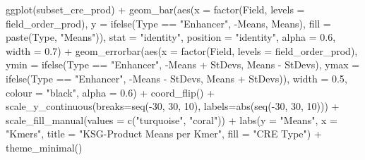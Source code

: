 \documentclass[
  letterpaper,
  DIV=11,
  numbers=noendperiod]{scrartcl}
\newenvironment{Shaded}{\begin{snugshade}}{\end{snugshade}}
\newcommand{\AttributeTok}[1]{\textcolor[rgb]{0.40,0.45,0.13}{#1}}
\newcommand{\DecValTok}[1]{\textcolor[rgb]{0.68,0.00,0.00}{#1}}
\newcommand{\FloatTok}[1]{\textcolor[rgb]{0.68,0.00,0.00}{#1}}
\newcommand{\FunctionTok}[1]{\textcolor[rgb]{0.28,0.35,0.67}{#1}}
\newcommand{\NormalTok}[1]{\textcolor[rgb]{0.00,0.23,0.31}{#1}}
\newcommand{\SpecialCharTok}[1]{\textcolor[rgb]{0.37,0.37,0.37}{#1}}
\newcommand{\StringTok}[1]{\textcolor[rgb]{0.13,0.47,0.30}{#1}}
\begin{document}
\begin{Shaded}
\begin{Highlighting}[]
\FunctionTok{ggplot}\NormalTok{(subset\_cre\_prod) }\SpecialCharTok{+}
  \FunctionTok{geom\_bar}\NormalTok{(}\FunctionTok{aes}\NormalTok{(}\AttributeTok{x =} \FunctionTok{factor}\NormalTok{(Field, }\AttributeTok{levels =}\NormalTok{ field\_order\_prod), }
               \AttributeTok{y =} \FunctionTok{ifelse}\NormalTok{(Type }\SpecialCharTok{==} \StringTok{"Enhancer"}\NormalTok{, }\SpecialCharTok{{-}}\NormalTok{Means, Means), }
                          \AttributeTok{fill =} \FunctionTok{paste}\NormalTok{(Type, }\StringTok{"Means"}\NormalTok{)),}
               \AttributeTok{stat =} \StringTok{"identity"}\NormalTok{, }\AttributeTok{position =} \StringTok{"identity"}\NormalTok{, }
               \AttributeTok{alpha =} \FloatTok{0.6}\NormalTok{, }\AttributeTok{width =} \FloatTok{0.7}\NormalTok{) }\SpecialCharTok{+}
  \FunctionTok{geom\_errorbar}\NormalTok{(}\FunctionTok{aes}\NormalTok{(}\AttributeTok{x =} \FunctionTok{factor}\NormalTok{(Field, }\AttributeTok{levels =}\NormalTok{ field\_order\_prod),}
                    \AttributeTok{ymin =} \FunctionTok{ifelse}\NormalTok{(Type }\SpecialCharTok{==} \StringTok{"Enhancer"}\NormalTok{,}
                                  \SpecialCharTok{{-}}\NormalTok{Means }\SpecialCharTok{+}\NormalTok{ StDevs, Means }\SpecialCharTok{{-}}\NormalTok{ StDevs),}
                    \AttributeTok{ymax =} \FunctionTok{ifelse}\NormalTok{(Type }\SpecialCharTok{==} \StringTok{"Enhancer"}\NormalTok{,}
                                  \SpecialCharTok{{-}}\NormalTok{Means }\SpecialCharTok{{-}}\NormalTok{ StDevs, Means }\SpecialCharTok{+}\NormalTok{ StDevs)),}
                \AttributeTok{width =} \FloatTok{0.5}\NormalTok{, }\AttributeTok{colour =} \StringTok{"black"}\NormalTok{, }\AttributeTok{alpha =} \FloatTok{0.6}\NormalTok{) }\SpecialCharTok{+}
  \FunctionTok{coord\_flip}\NormalTok{() }\SpecialCharTok{+}
  \FunctionTok{scale\_y\_continuous}\NormalTok{(}\AttributeTok{breaks=}\FunctionTok{seq}\NormalTok{(}\SpecialCharTok{{-}}\DecValTok{30}\NormalTok{, }\DecValTok{30}\NormalTok{, }\DecValTok{10}\NormalTok{), }\AttributeTok{labels=}\FunctionTok{abs}\NormalTok{(}\FunctionTok{seq}\NormalTok{(}\SpecialCharTok{{-}}\DecValTok{30}\NormalTok{, }\DecValTok{30}\NormalTok{, }\DecValTok{10}\NormalTok{))) }\SpecialCharTok{+}
  \FunctionTok{scale\_fill\_manual}\NormalTok{(}\AttributeTok{values =} \FunctionTok{c}\NormalTok{(}\StringTok{"turquoise"}\NormalTok{, }\StringTok{"coral"}\NormalTok{)) }\SpecialCharTok{+}
  \FunctionTok{labs}\NormalTok{(}\AttributeTok{y =} \StringTok{"Means"}\NormalTok{, }\AttributeTok{x =} \StringTok{"Kmers"}\NormalTok{, }
       \AttributeTok{title =} \StringTok{"KSG{-}Product Means per Kmer"}\NormalTok{, }
       \AttributeTok{fill =} \StringTok{"CRE Type"}\NormalTok{) }\SpecialCharTok{+}
  \FunctionTok{theme\_minimal}\NormalTok{()}
\end{Highlighting}
\end{Shaded}
\end{document}
